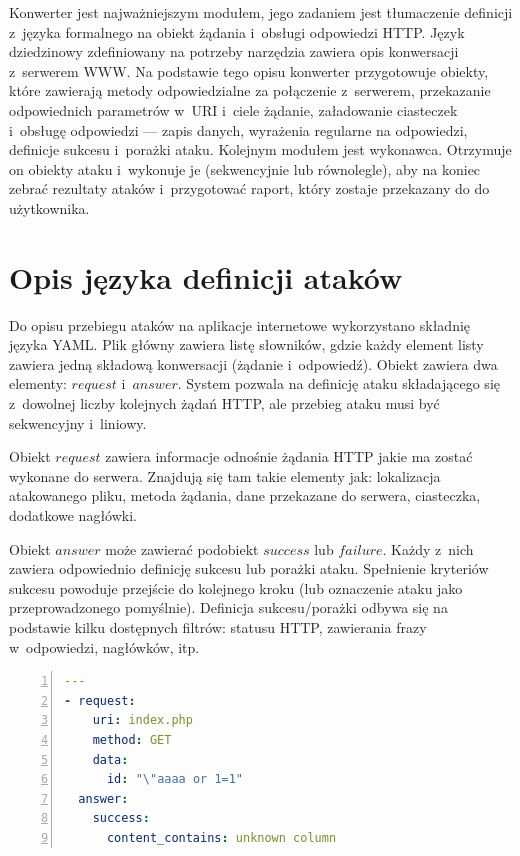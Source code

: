 \documentclass[12pt,a4paper,polish,thesis]{dcsbook}
\begin{document}
Konwerter jest najważniejszym modułem, jego zadaniem jest tłumaczenie definicji z~języka formalnego na obiekt żądania i~obsługi odpowiedzi HTTP. Język dziedzinowy zdefiniowany na potrzeby narzędzia zawiera opis konwersacji z~serwerem WWW. Na podstawie tego opisu konwerter przygotowuje obiekty, które zawierają metody odpowiedzialne za połączenie z~serwerem, przekazanie odpowiednich parametrów w~URI i~ciele żądanie, załadowanie ciasteczek i~obsługę odpowiedzi --- zapis danych, wyrażenia regularne na odpowiedzi, definicje sukcesu i~porażki ataku.
Kolejnym modułem jest wykonawca. Otrzymuje on obiekty ataku i~wykonuje je (sekwencyjnie lub równolegle), aby na koniec zebrać rezultaty ataków i~przygotować raport, który zostaje przekazany do do użytkownika.
 
\section{Opis języka definicji ataków} 
Do opisu przebiegu ataków na aplikacje internetowe wykorzystano składnię języka YAML.
Plik główny zawiera listę słowników, gdzie każdy element listy zawiera jedną składową konwersacji (żądanie i~odpowiedź). Obiekt zawiera dwa elementy: $request$ i~$answer$. System pozwala na definicję ataku składającego się z~dowolnej liczby kolejnych żądań HTTP, ale przebieg ataku musi być sekwencyjny i~liniowy.

Obiekt $request$ zawiera informacje odnośnie żądania HTTP jakie ma zostać wykonane do serwera. Znajdują się tam takie elementy jak: lokalizacja atakowanego pliku, metoda żądania, dane przekazane do serwera, ciasteczka, dodatkowe nagłówki.

Obiekt $answer$ może zawierać podobiekt $success$ lub $failure$. Każdy z~nich zawiera odpowiednio definicję sukcesu lub porażki ataku. Spełnienie kryteriów sukcesu powoduje przejście do kolejnego kroku (lub oznaczenie ataku jako przeprowadzonego pomyślnie). Definicja sukcesu/porażki odbywa się na podstawie kilku dostępnych filtrów: statusu HTTP, zawierania frazy w~odpowiedzi, nagłówków, itp.


\begin{lstlisting}[language=YAML,frame=single,label=def1,numbers=left,caption=przykład podstawowej definicji ataku]
---
- request:
    uri: index.php
    method: GET
    data:
      id: "\"aaaa or 1=1"
  answer:
    success:
      content_contains: unknown column
\end{lstlisting}
\end{document}
